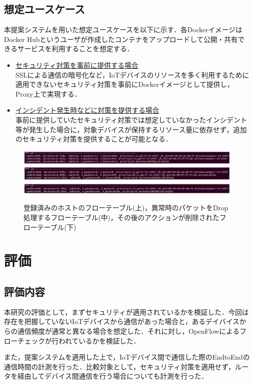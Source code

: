 \documentclass[Japanese]{dicomopapers}
\begin{document}
\subsection{想定ユースケース}
本提案システムを用いた想定ユースケースを以下に示す．各DockerイメージはDocker Hubというユーザが作成したコンテナをアップロードして公開・共有できるサービスを利用することを想定する．

\begin{itemize}
	\item \underline{セキュリティ対策を事前に提供する場合}\mbox{}\\
	      SSLによる通信の暗号化など，IoTデバイスのリソースを多く利用するために適用できないセキュリティ対策を事前にDockerイメージとして提供し，Proxy上で実現する．
	\item \underline{インシデント発生時などに対策を提供する場合}\mbox{}\\
	      事前に提供していたセキュリティ対策では想定していなかったインシデント等が発生した場合に，対象デバイスが保持するリソース量に依存せず，追加のセキュリティ対策を提供することが可能となる．
\end{itemize}

\begin{figure}[!tb]
	\centering
	\includegraphics[width=\linewidth]{img/result_flow4v2.eps}
	\includegraphics[width=\linewidth]{img/result_flow2v2.eps}
	\includegraphics[width=\linewidth]{img/result_flow3v2.eps}
	\caption{登録済みのホストのフローテーブル(上)，異常時のパケットをDrop処理するフローテーブル(中)，その後のアクションが削除されたフローテーブル(下)}
	\label{fig:result1}
\end{figure}

\section{評価}
\subsection{評価内容}
本研究の評価として，まずセキュリティが適用されているかを検証した．今回は存在を把握していないIoTデバイスから通信があった場合と，あるデイバイスからの通信頻度が通常と異なる場合を想定した．それに対し，OpenFlowによるフローチェックが行われているかを検証した．\par
また，提案システムを適用した上で，IoTデバイス間で通信した際のEndtoEndの通信時間の計測を行った．比較対象として，セキュリティ対策を適用せず，ルータを経由してデバイス間通信を行う場合についても計測を行った．
\end{document}
